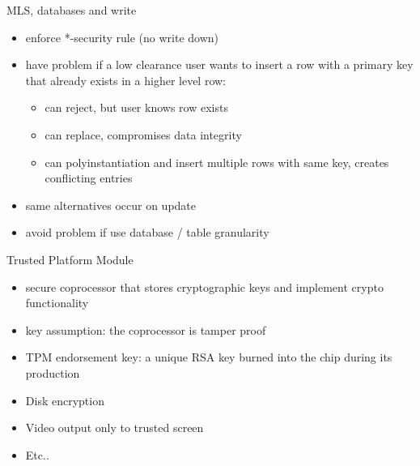 \documentclass{beamer}
\begin{document}
\begin{frame}{MLS, databases and write}
  \begin{itemize}
  \item enforce *-security rule (no write down) 
  \item have problem if a low clearance user wants to 
    insert a row with a primary key that already exists 
    in a higher level row:
    \begin{itemize}
    \item can reject, but user knows row exists 
    \item can replace, compromises data integrity 
    \item can polyinstantiation and insert multiple rows with same 
      key, creates conflicting entries
    \end{itemize}
  \item same alternatives occur on update 
  \item avoid problem if use database / table granularity
  \end{itemize}
\end{frame}

\begin{frame}{Trusted Platform Module}
  \begin{itemize}
  \item secure coprocessor that stores cryptographic keys and
    implement crypto functionality
  \item key assumption: the coprocessor is tamper proof
  \item TPM endorsement key: a unique RSA key burned into the chip
    during its production
  \item Disk encryption
  \item Video output only to trusted screen 
  \item Etc..
  \end{itemize}
\end{frame}
\end{document}
